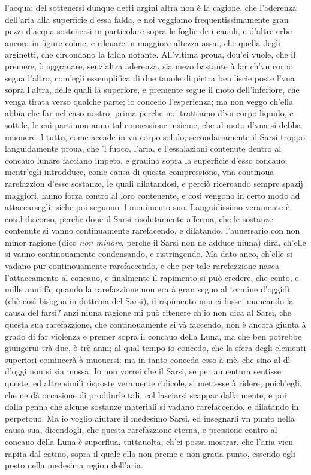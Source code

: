 \documentclass[11pt,twoside,openany]{book}
\begin{document}
l'acqua; del sottenersi dunque detti argini altra non è la cagione, che l'aderenza dell'aria alla superficie d'essa falda, e noi veggiamo frequentissimamente gran pezzi d'acqua sostenersi in particolare sopra le foglie de i cauoli, e d'altre erbe ancora in figure colme, e rileuare in maggiore altezza assai, che quella degli arginetti, che circondano la falda notante. All'vltima proua, dou'ei vuole, che il premere, ò aggrauare, senz'altra aderenza, sia mezo bastante à far ch'vn corpo segua l'altro, com'egli essemplifica di due tauole di pietra ben liscie poste l'vna sopra l'altra, delle quali la superiore, e premente segue il moto dell'inferiore, che venga tirata verso qualche parte; io concedo l'esperienza; ma non veggo ch'ella abbia che far nel caso nostro, prima perche noi trattiamo d'vn corpo liquido, e sottile, le cui parti non anno tal connessione insieme, che al moto d'vna si debba muouere il tutto, come accade in vn corpo solido; secondariamente il Sarsi troppo languidamente proua, che 'l fuoco, l'aria, e l'essalazioni contenute dentro al concauo lunare facciano impeto, e grauino sopra la superficie d'esso concauo; mentr'egli introdduce, come causa di questa compressione, vna continoua rarefazzion d'esse sostanze, le quali dilatandosi, e perciò ricercando sempre spazij maggiori, fanno forza contro al loro contenente, e così vengono in certo modo ad attaccarsegli, siche poi seguono il mouimento suo. Languidissimo veramente è cotal discorso, perche doue il Sarsi risolutamente afferma, che le sostanze contenute si vanno continuamente rarefacendo, e dilatando, l'auuersario con non minor ragione (dico \textit{non minore}, perche il Sarsi non ne adduce niuna) dirà, ch'elle si vanno continouamente condensando, e ristringendo. Ma dato anco, ch'elle si vadano pur continouamente rarefaccendo, e che per tale rarefazzione nasca l'attaccamento al concauo, e finalmente il rapimento si può credere, che cento, e mille anni fà, quando la rarefazzione non era à gran segno al termine d'oggidì (chè così bisogna in dottrina del Sarsi), il rapimento non ci fusse, mancando la causa del farsi? anzi niuna ragione mi può ritenere ch'io non dica al Sarsi, che questa sua rarefazzione, che continouamente si và faccendo, non è ancora giunta à grado di far violenza e premer sopra il concauo della Luna, ma che ben potrebbe giungerui trà due, ò trè anni; al qual tempo io concedo, che la sfera degli elementi superiori comincerà à muouersi; ma in tanto conceda esso à mè, che sino al dì d'oggi non si sia mossa. Io non vorrei che il Sarsi, se per auuentura sentisse queste, ed altre simili risposte veramente ridicole, si mettesse à ridere, poich'egli, che ne dà occasione di proddurle tali, col lasciarsi scappar dalla mente, e poi dalla penna che alcune sostanze materiali si vadano rarefaccendo, e dilatando in perpetouo. Ma io voglio aiutare il medesimo Sarsi, ed insegnarli vn punto nella causa sua, dicendogli, che questa rarefazzione eterna, e pressione contro al concauo della Luna è superflua, tuttauolta, ch'ei possa mostrar, che l'aria vien rapita dal catino, sopra il quale ella non preme e non graua punto, essendo egli posto nella medesima region dell'aria.
\end{document}
